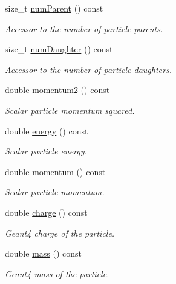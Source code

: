 \begin{DoxyCompactItemize}
size\+\_\+t \hyperlink{class_d_d4hep_1_1_simulation_1_1_geant4_particle_handle_a1f7178a004a1eb673c9a4b7b9b2b7ab8}{num\+Parent} () const
\begin{DoxyCompactList}\small\item\em Accessor to the number of particle parents. \end{DoxyCompactList}\item 
size\+\_\+t \hyperlink{class_d_d4hep_1_1_simulation_1_1_geant4_particle_handle_ac9eb570d22b96ba8680ff58a5168fe56}{num\+Daughter} () const
\begin{DoxyCompactList}\small\item\em Accessor to the number of particle daughters. \end{DoxyCompactList}\item 
double \hyperlink{class_d_d4hep_1_1_simulation_1_1_geant4_particle_handle_a51181874cfc7d9a6d92ae0ea029b99a8}{momentum2} () const
\begin{DoxyCompactList}\small\item\em Scalar particle momentum squared. \end{DoxyCompactList}\item 
double \hyperlink{class_d_d4hep_1_1_simulation_1_1_geant4_particle_handle_abe54a7ad661da4984b80bb681d442f57}{energy} () const
\begin{DoxyCompactList}\small\item\em Scalar particle energy. \end{DoxyCompactList}\item 
double \hyperlink{class_d_d4hep_1_1_simulation_1_1_geant4_particle_handle_ae18006ef026dee07b7f7f32f275a9820}{momentum} () const
\begin{DoxyCompactList}\small\item\em Scalar particle momentum. \end{DoxyCompactList}\item 
double \hyperlink{class_d_d4hep_1_1_simulation_1_1_geant4_particle_handle_a6eaf0e9cb53563445984bec270a06798}{charge} () const
\begin{DoxyCompactList}\small\item\em Geant4 charge of the particle. \end{DoxyCompactList}\item 
double \hyperlink{class_d_d4hep_1_1_simulation_1_1_geant4_particle_handle_a50d50871551d37f282ffbf7058de25f3}{mass} () const
\begin{DoxyCompactList}\small\item\em Geant4 mass of the particle. \end{DoxyCompactList}\item 

\end{DoxyCompactItemize}
